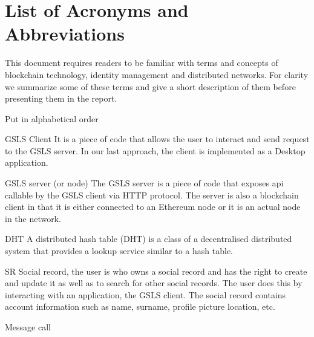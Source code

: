 \documentclass[12pt,twoside]{article}
\begin{document}
\clearpage

\tableofcontents

\section*{List of Acronyms and Abbreviations}
\label{list-of-acronyms-and-abbreviations}

This document requires readers to be familiar with terms and concepts of blockchain technology, identity management and distributed networks. For clarity we summarize some of these terms and give a short description of them before presenting them in the report.

\begin{annotation}
    Put in alphabetical order
\end{annotation}
\begin{basedescript}{\desclabelstyle{\pushlabel}\desclabelwidth{10em}}
\item[GSLS Client]              It is a piece of code that allows the user to interact and send request to the GSLS server. In our last approach, the client is implemented as a Desktop application.
\item[GSLS server (or node)]    The GSLS server is a piece of code that exposes api callable by the GSLS client via HTTP protocol. The server is also a blockchain client in that it is either connected to an Ethereum node or it is an actual node in the network.
\item[DHT]                      A distributed hash table (DHT) is a class of a decentralised distributed system that provides a lookup service similar to a hash table.
\item[SR]                       Social record, the user is who owns a social record and has the right to create and update it as well as to search for other social records. The user does this by interacting with an application, the GSLS client. The social record contains account information such as name, surname, profile picture location, etc.
\item[Message call]
\end{basedescript}


\clearpage







\appendix

\end{document}
